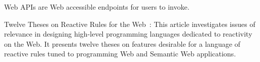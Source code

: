 Web APIs are Web accessible endpoints for users to invoke.

Twelve Theses on Reactive Rules for the Web~\cite{10.1007-11896548_63}:
This article investigates issues of relevance in designing high-level
programming languages dedicated to reactivity on the Web. It presents
twelve theses on features desirable for a language of reactive rules tuned
to programming Web and Semantic Web applications.




